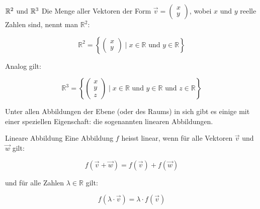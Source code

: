 \begin{definition}
    {$\mathbb{R}^2$ und $\mathbb{R}^3$}{}
    Die Menge aller Vektoren der Form \( \vec{v} = \begin{pmatrix} x \\ y \end{pmatrix} \), wobei \( x \) und \( y \) reelle Zahlen sind, nennt man \( \mathbb{R}^2 \):

    \[
    \mathbb{R}^2 = \left\{ \begin{pmatrix} x \\ y \end{pmatrix} \mid x \in \mathbb{R} \text{ und } y \in \mathbb{R} \right\}
    \]

    Analog gilt:

    \[
    \mathbb{R}^3 = \left\{ \begin{pmatrix} x \\ y \\ z \end{pmatrix} \mid x \in \mathbb{R} \text{ und } y \in \mathbb{R} \text{ und } z \in \mathbb{R} \right\}
    \]

\end{definition}
	
Unter allen Abbildungen der Ebene (oder des Raums) in sich gibt es einige mit einer speziellen Eigenschaft: die sogenannten linearen Abbildungen.

\begin{definition}
    {Lineare Abbildung}{}
    Eine Abbildung \( f \) heisst linear, wenn für alle Vektoren \( \vec{v} \) und \( \vec{w} \) gilt:

        \[
        f(\vec{v} + \vec{w}) = f(\vec{v}) + f(\vec{w})
        \]

        und für alle Zahlen \( \lambda \in \mathbb{R} \) gilt:

        \[
        f(\lambda \cdot \vec{v}) = \lambda \cdot f(\vec{v})
        \]

\end{definition}


